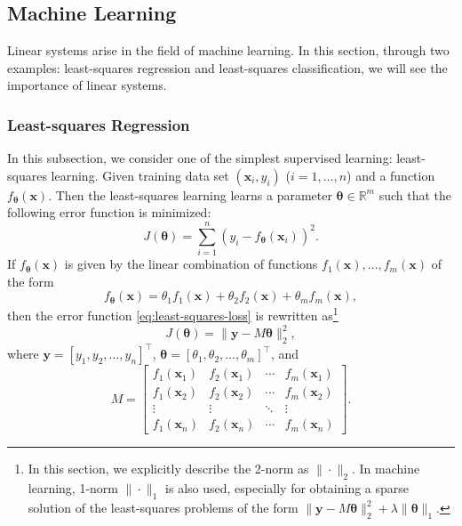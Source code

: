 \subsection{{Machine Learning}}\label{sec:machine-learning}
{Linear systems arise in the field of machine learning. In this section, through two examples: least-squares regression and least-squares classification, we will see the importance of linear systems.}
\subsubsection{{Least-squares Regression}}\label{subsec:least-squares-regression}
{In this subsection, we consider one of the simplest supervised learning: least-squares learning. Given training data set $(\boldsymbol{x}_i,y_i)$ ($i=1,\ldots,n$) and a function $f_{\boldsymbol{\theta}}(\boldsymbol{x})$. Then the least-squares learning learns a parameter $\boldsymbol{\theta}\in\mathbb{R}^m$ such that the following error function is minimized:}
\begin{equation}\label{eq:least-squares-loss}
J(\boldsymbol{\theta})=\sum_{i=1}^n(y_i-f_{\boldsymbol{\theta}}(\boldsymbol{x}_i))^2.
\end{equation}
{If $f_{\boldsymbol{\theta}}(\boldsymbol{x})$ is given by the linear combination of functions $f_1(\boldsymbol{x}),\ldots,f_m(\boldsymbol{x})$ of the form}
\begin{equation}\label{eq:regression-basis-model}
f_{\boldsymbol{\theta}}(\boldsymbol{x})=\theta_1f_1(\boldsymbol{x})+\theta_2f_2(\boldsymbol{x})+\theta_mf_m(\boldsymbol{x}),
\end{equation}
{then the error function \eqref{eq:least-squares-loss} is rewritten as}\footnote{{In this section, we explicitly describe the 2-norm as $\|\cdot\|_2$. In machine learning, 1-norm $\|\cdot\|_1$ is also used, especially for obtaining a sparse solution of the least-squares problems of the form $\|\boldsymbol{y}-M\boldsymbol{\theta}\|_2^2+\lambda\|\boldsymbol{\theta}\|_1$.}}
\begin{equation}\label{eq:least-squares-matrix-loss}
J(\boldsymbol{\theta})=\|\boldsymbol{y}-M\boldsymbol{\theta}\|_2^2,
\end{equation}
{where $\boldsymbol{y}=[y_1,y_2,\ldots,y_n]^{\top}$, $\boldsymbol{\theta}=[\theta_1,\theta_2,\ldots,\theta_m]^{\top}$, and}
\[M=\begin{bmatrix}
f_1(\boldsymbol{x}_1)&f_2(\boldsymbol{x}_1)&\cdots&f_m(\boldsymbol{x}_1)\\
f_1(\boldsymbol{x}_2)&f_2(\boldsymbol{x}_2)&\cdots&f_m(\boldsymbol{x}_2)\\
\vdots&\vdots&\ddots&\vdots\\
f_1(\boldsymbol{x}_n)&f_2(\boldsymbol{x}_n)&\cdots&f_m(\boldsymbol{x}_n)
\end{bmatrix}.\]
